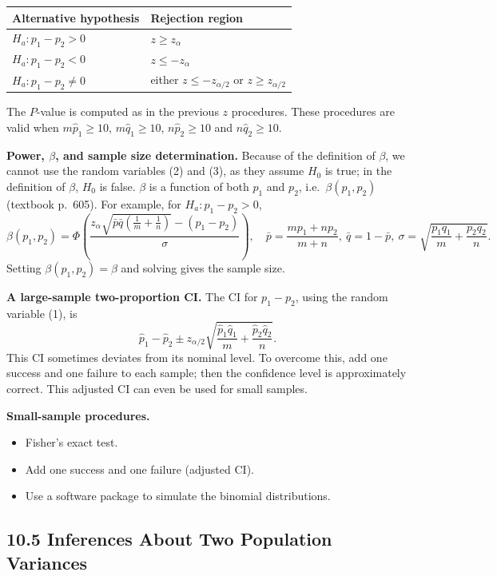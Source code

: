 \begin{center}
\begin{tabular}{ll}
\toprule
Alternative hypothesis & Rejection region\\
\midrule
$H_a:p_1-p_2>0$   & $z\ge z_\alpha$\\
$H_a:p_1-p_2<0$   & $z\le -z_\alpha$\\
$H_a:p_1-p_2\ne0$ & either $z\le -z_{\alpha/2}$ or $z\ge z_{\alpha/2}$\\
\bottomrule
\end{tabular}
\end{center}
The $P$-value is computed as in the previous $z$ procedures.
These procedures are valid when $m\hat{p}_1\ge10$, $m\hat{q}_1\ge10$, $n\hat{p}_2\ge10$ and $n\hat{q}_2\ge10$.

\textbf{Power, $\beta$, and sample size determination.}
Because of the definition of $\beta$, we cannot use the random variables (2) and (3), as they assume $H_0$ is true; in the definition of $\beta$, $H_0$ is false.
$\beta$ is a function of both $p_1$ and $p_2$, i.e.\ $\beta(p_1,p_2)$ (textbook p.~605). For example, for $H_a:p_1-p_2>0$,
\[
\beta(p_1,p_2) = \Phi\!\left(\frac{z_\alpha\sqrt{\bar{p}\bar{q}\left(\frac{1}{m}+\frac{1}{n}\right)}-(p_1-p_2)}{\sigma}\right),
\quad
\bar p=\frac{mp_1+np_2}{m+n},\ \bar q = 1-\bar p,\ \sigma=\sqrt{\frac{p_1q_1}{m}+\frac{p_2q_2}{n}} .
\]
Setting $\beta(p_1,p_2)=\beta$ and solving gives the sample size.

\textbf{A large-sample two-proportion CI.} The CI for $p_1-p_2$, using the random variable (1), is
\[
\hat{p}_1-\hat{p}_2 \pm z_{\alpha/2}\sqrt{\frac{\hat{p}_1\hat{q}_1}{m}+\frac{\hat{p}_2\hat{q}_2}{n}} .
\]
This CI sometimes deviates from its nominal level. To overcome this, add one success and one failure to each sample;
then the confidence level is approximately correct. This adjusted CI can even be used for small samples.

\textbf{Small-sample procedures.}
\begin{itemize}
  \item Fisher's exact test.
  \item Add one success and one failure (adjusted CI).
  \item Use a software package to simulate the binomial distributions.
\end{itemize}

\subsection*{10.5 Inferences About Two Population Variances}

